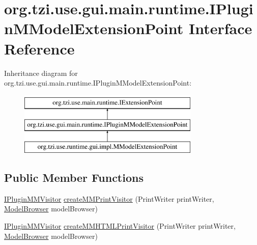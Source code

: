 \hypertarget{interfaceorg_1_1tzi_1_1use_1_1gui_1_1main_1_1runtime_1_1_i_plugin_m_model_extension_point}{\section{org.\-tzi.\-use.\-gui.\-main.\-runtime.\-I\-Plugin\-M\-Model\-Extension\-Point Interface Reference}
\label{interfaceorg_1_1tzi_1_1use_1_1gui_1_1main_1_1runtime_1_1_i_plugin_m_model_extension_point}
}
Inheritance diagram for org.\-tzi.\-use.\-gui.\-main.\-runtime.\-I\-Plugin\-M\-Model\-Extension\-Point\-:\begin{figure}[H]
\begin{center}
\leavevmode
\includegraphics[height=3.000000cm]{interfaceorg_1_1tzi_1_1use_1_1gui_1_1main_1_1runtime_1_1_i_plugin_m_model_extension_point}
\end{center}
\end{figure}
\subsection*{Public Member Functions}
\begin{DoxyCompactItemize}
\item 
\hyperlink{interfaceorg_1_1tzi_1_1use_1_1gui_1_1main_1_1runtime_1_1_i_plugin_m_m_visitor}{I\-Plugin\-M\-M\-Visitor} \hyperlink{interfaceorg_1_1tzi_1_1use_1_1gui_1_1main_1_1runtime_1_1_i_plugin_m_model_extension_point_a175f07860be0d1fdf8d3526bf0de2c51}{create\-M\-M\-Print\-Visitor} (Print\-Writer print\-Writer, \hyperlink{classorg_1_1tzi_1_1use_1_1gui_1_1main_1_1_model_browser}{Model\-Browser} model\-Browser)
\item 
\hyperlink{interfaceorg_1_1tzi_1_1use_1_1gui_1_1main_1_1runtime_1_1_i_plugin_m_m_visitor}{I\-Plugin\-M\-M\-Visitor} \hyperlink{interfaceorg_1_1tzi_1_1use_1_1gui_1_1main_1_1runtime_1_1_i_plugin_m_model_extension_point_a8ff1d28be94cb13d64050ba4e7d54ddd}{create\-M\-M\-H\-T\-M\-L\-Print\-Visitor} (Print\-Writer print\-Writer, \hyperlink{classorg_1_1tzi_1_1use_1_1gui_1_1main_1_1_model_browser}{Model\-Browser} model\-Browser)
\end{DoxyCompactItemize}


